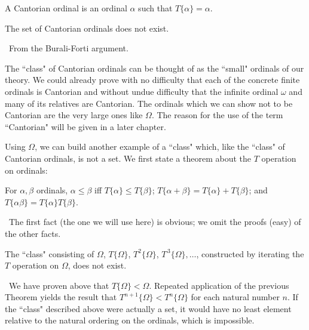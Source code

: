 \begin{definition}
 A {\upshape Cantorian} ordinal is an ordinal $\alpha$ such that $T\{\alpha\} = \alpha$. 
\end{definition}

\begin{thm}
 The set of Cantorian ordinals does not exist.
\end{thm}

\preuve\ From the Burali-Forti argument.
\finpreuve

The ``class" of Cantorian ordinals can be thought of as the
``small" ordinals of our theory.  We could already prove
with no difficulty that each of the concrete finite
ordinals is Cantorian and without undue difficulty that the
infinite ordinal $\omega$ and many of 
its relatives are Cantorian.  The ordinals which we can show {\upshape not\/}
to be Cantorian are the very large ones like $\Omega$.  The reason for
the use of the term ``Cantorian" will be given in a later chapter.  

Using $\Omega$, we can build another example of a ``class"
which, like the ``class" of Cantorian ordinals, is not a
set.  We first state a theorem about the $T$ operation on ordinals:

\begin{thm}
 For $\alpha,\beta$ ordinals, $\alpha \leq \beta$ iff
 $T\{\alpha\} \leq T\{\beta\}$; $T\{\alpha+\beta\} = T\{\alpha\} +
 T\{\beta\}$; and $T\{\alpha\beta\} = T\{\alpha\} T\{\beta\}$.
\end{thm}

\preuve\ The first fact (the one we will use here) is obvious; we omit
the proofs (easy) of the other facts.
\finpreuve

\begin{thm}
 The ``class" consisting of $\Omega$, $T\{\Omega\}$,
 $T^2\{\Omega\}$, $T^{\,3}\{\Omega\},\ldots$, constructed by iterating the $T$
 operation on $\Omega$, does not exist.
\end{thm}

\preuve\ We have proven above that $T\{\Omega\} < \Omega$.  Repeated
application of the previous Theorem yields the result that $T^{n+1}\{\Omega\}
< T^{n}\{\Omega\}$ for each natural number $n$.  If the
``class" described above were actually a set, it would have no least element
relative to the natural ordering on the ordinals, which
is impossible.
\finpreuve

